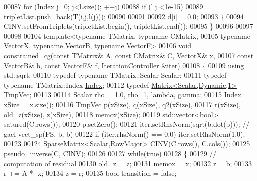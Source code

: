 \begin{DoxyCode}
00087     \textcolor{keywordflow}{for} (Index j=0; j<l.size(); ++j)
00088       \textcolor{keywordflow}{if} (l[j]<1e-15)
00089     tripletList.push\_back(T(i,j,l(j)));
00090 
00091     
00092     d[i] = 0.0;
00093   \}
00094   CINV.setFromTriplets(tripletList.begin(), tripletList.end());
00095 \}
00096 
00097 
00098 
00104 \textcolor{keyword}{template}<\textcolor{keyword}{typename} TMatrix, \textcolor{keyword}{typename} CMatrix,
00105          \textcolor{keyword}{typename} VectorX, \textcolor{keyword}{typename} VectorB, \textcolor{keyword}{typename} VectorF>
\hyperlink{namespace_eigen_1_1internal_a1c2f99746877fd46158af4a6b7dce2f9}{00106} \textcolor{keywordtype}{void} \hyperlink{namespace_eigen_1_1internal_a1c2f99746877fd46158af4a6b7dce2f9}{constrained\_cg}(\textcolor{keyword}{const} TMatrix& \hyperlink{group___core___module_class_eigen_1_1_matrix}{A}, \textcolor{keyword}{const} CMatrix& \hyperlink{group___core___module_class_eigen_1_1_matrix}{C}, VectorX& x,
00107                        \textcolor{keyword}{const} VectorB& b, \textcolor{keyword}{const} VectorF& f, \hyperlink{class_eigen_1_1_iteration_controller}{IterationController} &iter)
00108 \{
00109   \textcolor{keyword}{using} std::sqrt;
00110   \textcolor{keyword}{typedef} \textcolor{keyword}{typename} TMatrix::Scalar Scalar;
00111   \textcolor{keyword}{typedef} \textcolor{keyword}{typename} TMatrix::Index \hyperlink{namespace_eigen_a62e77e0933482dafde8fe197d9a2cfde}{Index};
00112   \textcolor{keyword}{typedef} \hyperlink{group___core___module}{Matrix<Scalar,Dynamic,1>}  TmpVec;
00113 
00114   Scalar rho = 1.0, rho\_1, lambda, gamma;
00115   Index xSize = x.size();
00116   TmpVec  p(xSize), q(xSize), q2(xSize),
00117           r(xSize), old\_z(xSize), z(xSize),
00118           memox(xSize);
00119   std::vector<bool> satured(C.rows());
00120   p.setZero();
00121   iter.setRhsNorm(sqrt(b.dot(b))); \textcolor{comment}{// gael vect\_sp(PS, b, b)}
00122   \textcolor{keywordflow}{if} (iter.rhsNorm() == 0.0) iter.setRhsNorm(1.0);
00123 
00124   \hyperlink{group___sparse_core___module}{SparseMatrix<Scalar,RowMajor>} CINV(C.rows(), C.cols());
00125   \hyperlink{namespace_eigen_1_1internal_a58a0ccf0e71d88beeb5dcf72ed0bdd5f}{pseudo\_inverse}(C, CINV);
00126 
00127   \textcolor{keywordflow}{while}(\textcolor{keyword}{true})
00128   \{
00129     \textcolor{comment}{// computation of residual}
00130     old\_z = z;
00131     memox = x;
00132     r = b;
00133     r += A * -x;
00134     z = r;
00135     \textcolor{keywordtype}{bool} transition = \textcolor{keyword}{false};

\end{DoxyCode}
